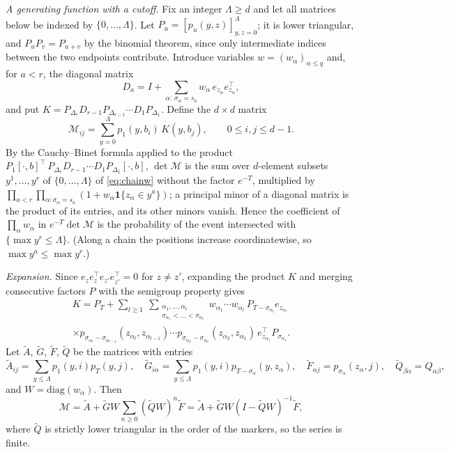 \documentclass[11pt]{amsart}
\theoremstyle{remark}
\numberwithin{equation}{section}
\begin{document}
\emph{A generating function with a cutoff.} Fix an integer $\Lambda\ge d$ and let all matrices below be indexed by $\{0,\dots,\Lambda\}$. Let $P_u=[p_u(y,z)]_{y,z=0}^\Lambda$; it is lower triangular, and $P_uP_v=P_{u+v}$ by the binomial theorem, since only intermediate indices between the two endpoints contribute. Introduce variables $w=(w_\alpha)_{\alpha\le q}$ and, for $a<r$, the diagonal matrix
\[
D_a=I+\sum_{\alpha:\ \sigma_\alpha=s_a}w_\alpha\,e_{z_\alpha}e_{z_\alpha}^{\top},
\]
and put $K=P_{\Delta_r}D_{r-1}P_{\Delta_{r-1}}\cdots D_1P_{\Delta_1}$. Define the $d\times d$ matrix
\[
\mathcal M_{ij}=\sum_{y=0}^{\Lambda}p_1(y,b_i)\,K(y,b_j),\qquad 0\le i,j\le d-1 .
\]
By the Cauchy--Binet formula applied to the product $P_1[\cdot,b]^{\top}\,P_{\Delta_r}D_{r-1}\cdots D_1P_{\Delta_1}[\cdot,b]$, $\det\mathcal M$ is the sum over $d$-element subsets $y^1,\dots,y^r$ of $\{0,\dots,\Lambda\}$ of \eqref{eq:chainw} without the factor $e^{-T}$, multiplied by $\prod_{a<r}\prod_{\alpha:\sigma_\alpha=s_a}(1+w_\alpha\mathbf 1\{z_\alpha\in y^a\})$; a principal minor of a diagonal matrix is the product of its entries, and its other minors vanish. Hence the coefficient of $\prod_\alpha w_\alpha$ in $e^{-T}\det\mathcal M$ is the probability of the event intersected with $\{\max y^r\le\Lambda\}$. (Along a chain the positions increase coordinatewise, so $\max y^a\le\max y^r$.)

\emph{Expansion.} Since $e_ze_z^{\top}e_{z'}e_{z'}^{\top}=0$ for $z\ne z'$, expanding the product $K$ and merging consecutive factors $P$ with the semigroup property gives
\begin{multline*}
K=P_T+\sum_{l\ge1}\ \sum_{\substack{\alpha_1,\dots,\alpha_l\\ \sigma_{\alpha_1}<\dots<\sigma_{\alpha_l}}}w_{\alpha_1}\cdots w_{\alpha_l}\,P_{T-\sigma_{\alpha_l}}e_{z_{\alpha_l}}\\
\times p_{\sigma_{\alpha_l}-\sigma_{\alpha_{l-1}}}(z_{\alpha_l},z_{\alpha_{l-1}})\cdots p_{\sigma_{\alpha_2}-\sigma_{\alpha_1}}(z_{\alpha_2},z_{\alpha_1})\,e_{z_{\alpha_1}}^{\top}P_{\sigma_{\alpha_1}}.
\end{multline*}
Let $\tilde A$, $\tilde G$, $\tilde F$, $\tilde Q$ be the matrices with entries
\[
\tilde A_{ij}=\sum_{y\le\Lambda}p_1(y,i)p_T(y,j),\quad \tilde G_{i\alpha}=\sum_{y\le\Lambda}p_1(y,i)p_{T-\sigma_\alpha}(y,z_\alpha),\quad \tilde F_{\alpha j}=p_{\sigma_\alpha}(z_\alpha,j),\quad \tilde Q_{\beta\alpha}=Q_{\alpha\beta},
\]
and $W=\mathrm{diag}(w_\alpha)$. Then
\[
\mathcal M=\tilde A+\tilde GW\sum_{n\ge0}(\tilde QW)^n\tilde F=\tilde A+\tilde GW(I-\tilde QW)^{-1}\tilde F,
\]
where $\tilde Q$ is strictly lower triangular in the order of the markers, so the series is finite.
\end{document}
